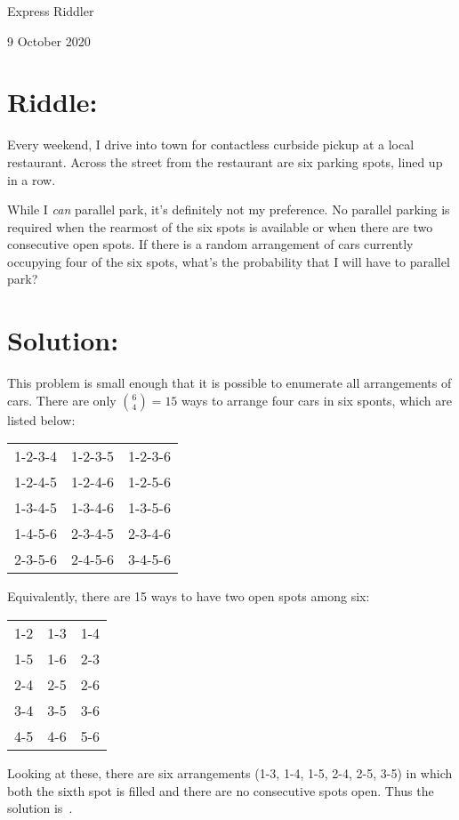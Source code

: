 \documentclass{article}
\begin{document}
\pagestyle{empty} %

\begin{center}
{\LARGE Express Riddler}

\vspace{0.15in}

{\Large 9 October 2020}
\end{center}


\section*{Riddle:}

Every weekend, I drive into town for contactless curbside pickup at a local restaurant.
Across the street from the restaurant are six parking spots, lined up in a row.

While I \textit{can} parallel park, it's definitely not my preference.
No parallel parking is required when the rearmost of the six spots is available or when there are two consecutive open spots.
If there is a random arrangement of cars currently occupying four of the six spots, what's the probability that I will have to parallel park?

\section*{Solution:}

This problem is small enough that it is possible to enumerate all arrangements of cars.
There are only $\binom{6}{4}=15$ ways to arrange four cars in six sponts, which are listed below:

\begin{center}
\begin{tabular}{c c c}
1-2-3-4 & 1-2-3-5 & 1-2-3-6 \\
1-2-4-5 & 1-2-4-6 & 1-2-5-6 \\
1-3-4-5 & 1-3-4-6 & 1-3-5-6 \\
1-4-5-6 & 2-3-4-5 & 2-3-4-6 \\
2-3-5-6 & 2-4-5-6 & 3-4-5-6 \\
\end{tabular}
\end{center}

Equivalently, there are 15 ways to have two open spots among six:

\begin{center}
\begin{tabular}{c c c}
1-2 & 1-3 & 1-4 \\
1-5 & 1-6 & 2-3 \\
2-4 & 2-5 & 2-6 \\
3-4 & 3-5 & 3-6 \\
4-5 & 4-6 & 5-6 \\
\end{tabular}
\end{center}

Looking at these, there are six arrangements (1-3, 1-4, 1-5, 2-4, 2-5, 3-5) in which both the sixth spot is filled and there are no consecutive spots open.
Thus the solution is
\,.
\end{document}
